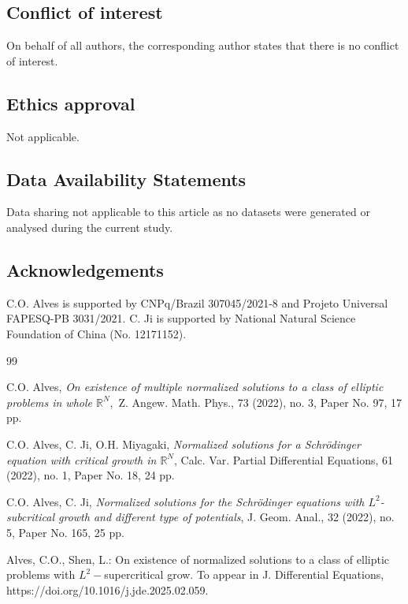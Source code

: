 \documentclass[11pt]{amsart}
\numberwithin{equation}{section}
\begin{document}
{{{\subsection*{Conflict of interest}

On behalf of all authors, the corresponding author states that there is no conflict of interest.

\subsection*{Ethics approval}
 Not applicable.

\subsection*{Data Availability Statements}
Data sharing not applicable to this article as no datasets were generated or analysed during the current study.


\subsection*{Acknowledgements}
C.O. Alves is supported by CNPq/Brazil 307045/2021-8 and Projeto Universal FAPESQ-PB 3031/2021. C. Ji is supported by National Natural Science Foundation of China (No. 12171152).






\begin{thebibliography}{99}

 C.O. Alves, {\it On existence of multiple normalized solutions to a class of elliptic problems in whole $\mathbb R^N,$}
Z. Angew. Math. Phys., 73 (2022), no. 3, Paper No. 97, 17 pp.

 C.O. Alves,  C. Ji, O.H. Miyagaki, {\it Normalized solutions for a Schr\"{o}dinger equation with critical growth in $\mathbb{R}^{N}$}, Calc. Var. Partial Differential Equations, 61 (2022), no. 1, Paper No. 18, 24 pp.

 C.O. Alves, C. Ji, {\it Normalized solutions for the Schr\"odinger equations with $L^2$-subcritical growth and different type of potentials},
J. Geom. Anal., 32 (2022), no. 5, Paper No. 165, 25 pp.

 Alves, C.O., Shen, L.: On existence of normalized solutions to a class of elliptic problems with $L^2-$supercritical grow. To appear in J. Differential Equations, https://doi.org/10.1016/j.jde.2025.02.059.


\end{thebibliography}}}}
\end{document}
